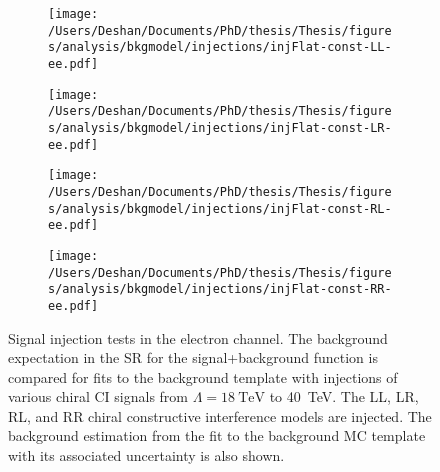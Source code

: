 \begin{figure}[h!]
    \centering
    \begin{subfigure}[b]{0.49\textwidth}
        \centering
        \texttt{[image: /Users/Deshan/Documents/PhD/thesis/Thesis/figures/analysis/bkgmodel/injections/injFlat-const-LL-ee.pdf]}
        \label{fig:bkgmodel:injee1}
    \end{subfigure}
    \begin{subfigure}[b]{0.49\textwidth}
        \centering
        \texttt{[image: /Users/Deshan/Documents/PhD/thesis/Thesis/figures/analysis/bkgmodel/injections/injFlat-const-LR-ee.pdf]}
        \label{fig:bkgmodel:injee3}
    \end{subfigure}
    \begin{subfigure}[b]{0.49\textwidth}
        \centering
        \texttt{[image: /Users/Deshan/Documents/PhD/thesis/Thesis/figures/analysis/bkgmodel/injections/injFlat-const-RL-ee.pdf]}
        \label{fig:bkgmodel:injee5}
    \end{subfigure}
    \begin{subfigure}[b]{0.49\textwidth}
        \centering
        \texttt{[image: /Users/Deshan/Documents/PhD/thesis/Thesis/figures/analysis/bkgmodel/injections/injFlat-const-RR-ee.pdf]}
        \label{fig:bkgmodel:injee7}
    \end{subfigure}
    \caption[Signal injection tests in the electron channel for constructive interference models]{Signal injection tests in the electron channel. The background expectation in the SR for the signal+background function is compared for fits to the background template with injections of various chiral CI signals from $\Lambda = \SI{18}{\tera\electronvolt}$ to \SI{40}{\tera\electronvolt}. The LL, LR, RL, and RR chiral constructive interference models are injected. The background estimation from the fit to the background MC template with its associated uncertainty is also shown.}
    \label{fig:bkgmodel:injeeconst}
\end{figure}

